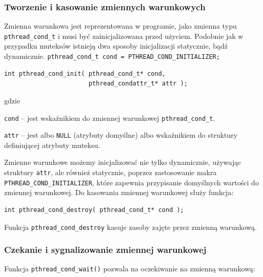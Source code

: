 \subsubsection{Tworzenie i kasowanie zmiennych warunkowych}

Zmienna warunkowa jest reprezentowana w programie, jako zmienna typu \lstinline[style=MyCStyle]{pthread_cond_t} i musi być zainicjalizowana przed użyciem. Podobnie jak w przypadku muteksów istnieją dwa sposoby inicjalizacji statycznie, bądź dynamicznie. 
\lstinline[style=MyCStyle]{pthread_cond_t cond = PTHREAD_COND_INITIALIZER;}

\begin{lstlisting}[style=MyCStyle]
int pthread_cond_init( pthread_cond_t* cond,
                       pthread_condattr_t* attr );
\end{lstlisting}

gdzie 

\begin{myitemize}
\item \lstinline[style=MyCStyle]{cond} -- jest wskaźnikiem do zmiennej warunkowej \lstinline[style=MyCStyle]{pthread_cond_t}.
\item \lstinline[style=MyCStyle]{attr} -- jest albo \lstinline[style=MyCStyle]{NULL} (atrybuty domyślne) albo wskaźnikiem do struktury definiującej atrybuty muteksu.  
\end{myitemize}


Zmienne warunkowe możemy inicjalizować nie tylko dynamicznie, używając struktury \lstinline[style=MyCStyle]{attr}, ale również  statycznie, poprzez zastosowanie makra \lstinline[style=MyCStyle]{PTHREAD_COND_INITIALIZER}, które zapewnia przypisanie domyślnych wartości do zmiennej warunkowej. Do kasowania zmiennej warunkowej służy funkcja:


\begin{lstlisting}[style=MyCStyle]
int pthread_cond_destroy( pthread_cond_t* cond );
\end{lstlisting}

Funkcja \lstinline[style=MyCStyle]{pthread_cond_destroy} kasuje zasoby zajęte przez zmienną warunkową.

\subsubsection{Czekanie i sygnalizowanie zmiennej warunkowej}

Funkcja \lstinline[style=MyCStyle]{pthread_cond_wait()} pozwala na oczekiwanie na zmienną warunkową:

